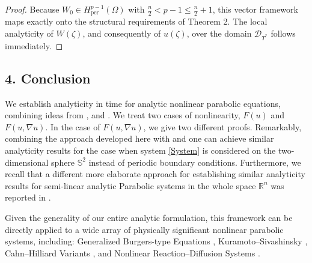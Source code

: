 \documentclass[12pt]{article}
\theoremstyle{plain}
\theoremstyle{remark}
\begin{document}
\begin{proof}
Because $W_0 \in H^{p-1}_{\text{per}}(\Omega)$ with $\frac{n}{2} < p-1 \leq \frac{n}{2}+1$, this vector framework maps exactly onto the structural requirements of Theorem 2. The local analyticity of $W(\zeta)$, and consequently of $u(\zeta)$, over the domain $\mathcal{D}_{T^*}$ follows immediately.
\end{proof}

\subsection*{4. Conclusion}

We establish analyticity in time for analytic nonlinear parabolic equations, combining ideas from \cite{FerrariTiti1998}, \cite{FoiasTemam1979} and \cite{FoiasTemam1989}. We treat two cases of nonlinearity, $F(u)$ and $F(u,\nabla u)$. In the case of $F(u,\nabla u)$, we give two different proofs. Remarkably, combining the approach developed here with \cite{Cao-Rammaha1} and \cite{Cao-Rammaha2} one can achieve similar analyticity results for the case when system \eqref{System} is considered on the two-dimensional sphere $\mathbb{S}^2$ instead of periodic boundary conditions. Furthermore, we recall that a different more elaborate approach for establishing similar analyticity results for semi-linear analytic Parabolic systems  in the whole space $\mathbb{R}^n$ was reported in \cite{Takac}.

Given the generality of our entire analytic formulation, this framework can be directly applied to a wide array of physically significant nonlinear parabolic systems, including: Generalized Burgers-type Equations \cite{Cole1951}, Kuramoto--Sivashinsky \cite{Kuramoto1978}, Cahn--Hilliard Variants \cite{Wu2022CahnHilliard}, and Nonlinear Reaction--Diffusion Systems \cite{Turing1952}.
\end{document}
